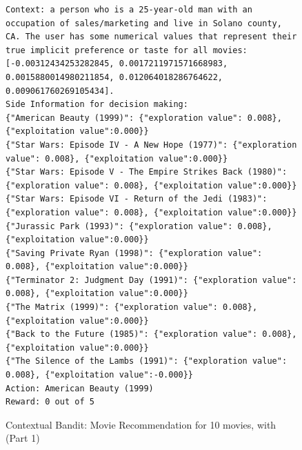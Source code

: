 \begin{figure}[ht]
\begin{lstlisting}[escapechar=!]
Context: a person who is a 25-year-old man with an occupation of sales/marketing and live in Solano county, CA. The user has some numerical values that represent their true implicit preference or taste for all movies: [-0.00312434253282845, 0.0017211971571668983, 0.0015880014980211854, 0.012064018286764622, 0.009061760269105434].
Side Information for decision making:
{"American Beauty (1999)": {"exploration value": 0.008}, {"exploitation value":0.000}}
{"Star Wars: Episode IV - A New Hope (1977)": {"exploration value": 0.008}, {"exploitation value":0.000}}
{"Star Wars: Episode V - The Empire Strikes Back (1980)": {"exploration value": 0.008}, {"exploitation value":0.000}}
{"Star Wars: Episode VI - Return of the Jedi (1983)": {"exploration value": 0.008}, {"exploitation value":0.000}}
{"Jurassic Park (1993)": {"exploration value": 0.008}, {"exploitation value":0.000}}
{"Saving Private Ryan (1998)": {"exploration value": 0.008}, {"exploitation value":0.000}}
{"Terminator 2: Judgment Day (1991)": {"exploration value": 0.008}, {"exploitation value":0.000}}
{"The Matrix (1999)": {"exploration value": 0.008}, {"exploitation value":0.000}}
{"Back to the Future (1985)": {"exploration value": 0.008}, {"exploitation value":0.000}}
{"The Silence of the Lambs (1991)": {"exploration value": 0.008}, {"exploitation value":-0.000}}
Action: American Beauty (1999)
Reward: 0 out of 5
    \end{lstlisting}
    \caption{Contextual Bandit: Movie Recommendation for 10 movies, with \ag (Part 1)}
    \label{fig:cb_movie_10_rh_ag_part1}
\end{figure}


